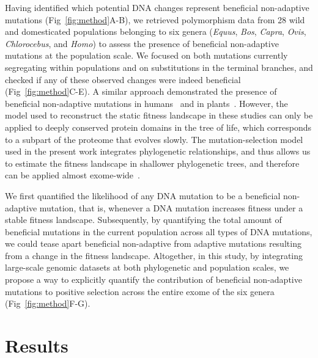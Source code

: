 \documentclass[10pt,letterpaper]{article}
\begin{document}
Having identified which potential DNA changes represent beneficial non-adaptive mutations (Fig~\ref{fig:method}A-B), we retrieved polymorphism data from 28 wild and domesticated populations belonging to six genera (\textit{Equus}, \textit{Bos}, \textit{Capra}, \textit{Ovis}, \textit{Chlorocebus}, and \textit{Homo}) to assess the presence of beneficial non-adaptive mutations at the population scale.
We focused on both mutations currently segregating within populations and on substitutions in the terminal branches, and checked if any of these observed changes were indeed beneficial (Fig~\ref{fig:method}C-E).
A similar approach demonstrated the presence of beneficial non-adaptive mutations in humans~\cite{moses_inferring_2009, fischer_germline_2011} and in plants~\cite{chen_hunting_2021}.
However, the model used to reconstruct the static fitness landscape in these studies can only be applied to deeply conserved protein domains in the tree of life, which corresponds to a subpart of the proteome that evolves slowly.
The mutation-selection model used in the present work integrates phylogenetic relationships, and thus allows us to estimate the fitness landscape in shallower phylogenetic trees, and therefore can be applied almost exome-wide~\cite{rodrigue_mutationselection_2010}.

We first quantified the likelihood of any DNA mutation to be a beneficial non-adaptive mutation, that is, whenever a DNA mutation increases fitness under a stable fitness landscape.
Subsequently, by quantifying the total amount of beneficial mutations in the current population across all types of DNA mutations, we could tease apart beneficial non-adaptive from adaptive mutations resulting from a change in the fitness landscape.
Altogether, in this study, by integrating large-scale genomic datasets at both phylogenetic and population scales, we propose a way to explicitly quantify the contribution of beneficial non-adaptive mutations to positive selection across the entire exome of the six genera (Fig~\ref{fig:method}F-G).

\section*{Results}
\end{document}
